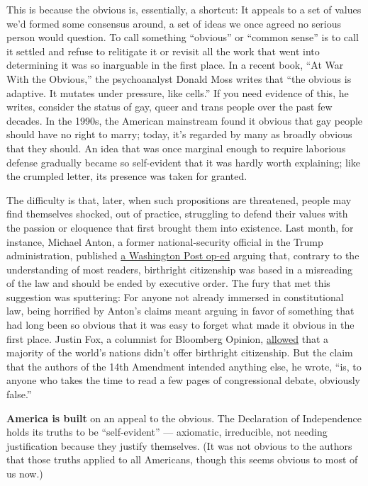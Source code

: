 This is because the obvious is, essentially, a shortcut: It appeals to a
set of values we'd formed some consensus around, a set of ideas we once
agreed no serious person would question. To call something ``obvious''
or ``common sense'' is to call it settled and refuse to relitigate it or
revisit all the work that went into determining it was so inarguable in
the first place. In a recent book, ``At War With the Obvious,'' the
psychoanalyst Donald Moss writes that ``the obvious is adaptive. It
mutates under pressure, like cells.'' If you need evidence of this, he
writes, consider the status of gay, queer and trans people over the past
few decades. In the 1990s, the American mainstream found it obvious that
gay people should have no right to marry; today, it's regarded by many
as broadly obvious that they should. An idea that was once marginal
enough to require laborious defense gradually became so self-evident
that it was hardly worth explaining; like the crumpled letter, its
presence was taken for granted.

The difficulty is that, later, when such propositions are threatened,
people may find themselves shocked, out of practice, struggling to
defend their values with the passion or eloquence that first brought
them into existence. Last month, for instance, Michael Anton, a former
national-security official in the Trump administration, published
\href{https://www.washingtonpost.com/opinions/citizenship-shouldnt-be-a-birthright/2018/07/18/7d0e2998-8912-11e8-85ae-511bc1146b0b_story.html}{a
Washington Post op-ed} arguing that, contrary to the understanding of
most readers, birthright citizenship was based in a misreading of the
law and should be ended by executive order. The fury that met this
suggestion was sputtering: For anyone not already immersed in
constitutional law, being horrified by Anton's claims meant arguing in
favor of something that had long been so obvious that it was easy to
forget what made it obvious in the first place. Justin Fox, a columnist
for Bloomberg Opinion,
\href{https://www.bloomberg.com/view/articles/2018-07-24/ignore-fake-arguments-over-birthright-citizenship}{allowed}
that a majority of the world's nations didn't offer birthright
citizenship. But the claim that the authors of the 14th Amendment
intended anything else, he wrote, ``is, to anyone who takes the time to
read a few pages of congressional debate, obviously false.''

\textbf{America is built} on an appeal to the obvious. The Declaration
of Independence holds its truths to be ``self-evident'' --- axiomatic,
irreducible, not needing justification because they justify themselves.
(It was not obvious to the authors that those truths applied to all
Americans, though this seems obvious to most of us now.)

